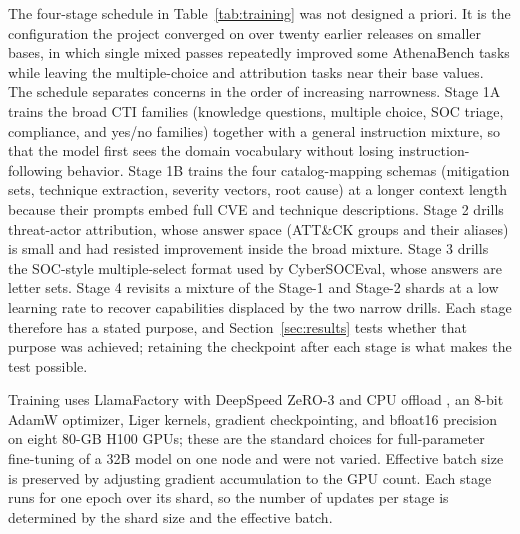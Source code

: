 \documentclass[twocolumn]{svjour3}
\begin{document}
The four-stage schedule in Table~\ref{tab:training} was not designed a priori. It is the configuration the project converged on over twenty earlier releases on smaller bases, in which single mixed passes repeatedly improved some AthenaBench tasks while leaving the multiple-choice and attribution tasks near their base values. The schedule separates concerns in the order of increasing narrowness. Stage 1A trains the broad CTI families (knowledge questions, multiple choice, SOC triage, compliance, and yes/no families) together with a general instruction mixture, so that the model first sees the domain vocabulary without losing instruction-following behavior. Stage 1B trains the four catalog-mapping schemas (mitigation sets, technique extraction, severity vectors, root cause) at a longer context length because their prompts embed full CVE and technique descriptions. Stage 2 drills threat-actor attribution, whose answer space (ATT\&CK groups and their aliases) is small and had resisted improvement inside the broad mixture. Stage 3 drills the SOC-style multiple-select format used by CyberSOCEval, whose answers are letter sets. Stage 4 revisits a mixture of the Stage-1 and Stage-2 shards at a low learning rate to recover capabilities displaced by the two narrow drills. Each stage therefore has a stated purpose, and Section~\ref{sec:results} tests whether that purpose was achieved; retaining the checkpoint after each stage is what makes the test possible.

Training uses LlamaFactory \cite{zheng2024llamafactory} with DeepSpeed ZeRO-3 and CPU offload \cite{rajbhandari2020zero}, an 8-bit AdamW optimizer, Liger kernels, gradient checkpointing, and bfloat16 precision on eight 80-GB H100 GPUs; these are the standard choices for full-parameter fine-tuning of a 32B model on one node and were not varied. Effective batch size is preserved by adjusting gradient accumulation to the GPU count. Each stage runs for one epoch over its shard, so the number of updates per stage is determined by the shard size and the effective batch.
\end{document}
